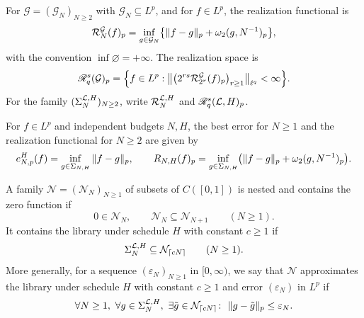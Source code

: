 \documentclass[11pt,a4paper]{article}
\begin{document}
\begin{definicao}
\label{lp:def:realization}
For $\mathcal G=(\mathcal G_N)_{N\ge2}$ with $\mathcal G_N\subseteq L^p$, and for $f\in L^p$, the realization functional is
\begin{equation}
 \mathcal R^{\mathcal G}_{N}(f)_p
 =\inf_{g\in\mathcal G_N}\bigl\{\|f-g\|_p+\omega_2(g,N^{-1})_{p}\bigr\},
 \label{lp:eq:realization-p}
\end{equation}
with the convention $\inf\varnothing=+\infty$. The realization space is
\begin{equation}
 \mathscr R^{s}_{q}(\mathcal G)_p
 =\Bigl\{f\in L^p:\big\|\big(2^{rs}\mathcal R^{\mathcal G}_{2^r}(f)_p\big)_{r\ge1}\big\|_{\ell^q}<\infty\Bigr\}.
 \label{lp:eq:stratum-p}
\end{equation}
For the family $(\Sigma_{N}^{\mathcal L,H})_{N\ge2}$, write $\mathcal R^{\mathcal L,H}_{N}$ and $\mathscr R^{s}_{q}(\mathcal L,H)_p$.
\end{definicao}

For $f\in L^p$ and independent budgets $N,H$, the best error for $N\ge1$ and the realization functional for $N\ge2$ are given by
\[
 e^H_{N,p}(f)=\inf_{g\in\Sigma_{N,H}}\|f-g\|_p,\qquad
 R_{N,H}(f)_p=\inf_{g\in\Sigma_{N,H}}
 \bigl(\|f-g\|_p+\omega_2(g,N^{-1})_{p}\bigr).
\]

\begin{definicao}
\label{lp:def:network-family}
A family $\mathcal N=(\mathcal N_N)_{N\ge1}$ of subsets of $C([0,1])$ is nested and contains the zero function if
\begin{equation}
 0\in\mathcal N_N,\qquad \mathcal N_N\subseteq\mathcal N_{N+1}\qquad(N\ge1).
 \label{lp:eq:nesting}
\end{equation}
It contains the library under schedule $H$ with constant $c\ge1$ if
\begin{equation}
 \Sigma_{N}^{\mathcal L,H}\subseteq\mathcal N_{\lceil cN\rceil}\qquad(N\ge1).
 \label{lp:eq:contains}
\end{equation}
More generally, for a sequence $(\varepsilon_N)_{N\ge1}$ in $[0,\infty)$, we say that $\mathcal N$ approximates the library under schedule $H$ with constant $c\ge1$ and error $(\varepsilon_N)$ in $L^p$ if
\begin{equation}
 \forall N\ge1,\ \forall g\in\Sig{N},\ \exists\tilde g\in\mathcal N_{\lceil cN\rceil}\colon\ \|g-\tilde g\|_p\le\varepsilon_N.
 \label{lp:eq:approx-contains}
\end{equation}
\end{definicao}
\end{document}
